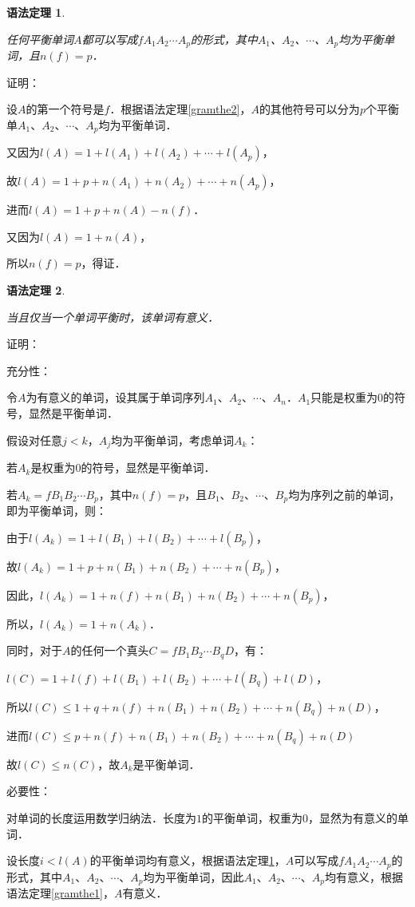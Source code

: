 \documentclass[12pt, a4paper, oneside]{book}
\newtheorem{gramthe}{语法定理}
\begin{document}
			\begin{gramthe}\label{gramthe3}
				\hfill\par
				任何平衡单词$A$都可以写成$fA_1A_2\cdots A_p$的形式，其中$A_1$、$A_2$、$\cdots$、$A_p$均为平衡单词，且$n(f)=p$．	
			\end{gramthe}			
			证明：
			\par
			设$A$的第一个符号是$f$．根据语法定理\ref{gramthe2}，$A$的其他符号可以分为$p$个平衡单$A_1$、$A_2$、$\cdots$、$A_p$均为平衡单词．
			\par
			又因为$l(A)=1+l(A_1)+l(A_2)+\cdots+l(A_p)$，
			\par
			故$l(A)=1+p+n(A_1)+n(A_2)+\cdots+n(A_p)$，
			\par
			进而$l(A)=1+p+n(A)-n(f)$．
			\par
			又因为$l(A)=1+n(A)$，
			\par
			所以$n(f)=p$，得证．
								
			\begin{gramthe}\label{gramthe4}
				\hfill\par
				当且仅当一个单词平衡时，该单词有意义．			
			\end{gramthe}			
			证明：
			\par
			充分性：
			\par
			令$A$为有意义的单词，设其属于单词序列$A_1$、$A_2$、$\cdots$、$A_n$．$A_1$只能是权重为$0$的符号，显然是平衡单词．
			\par
			假设对任意$j<k$，$A_j$均为平衡单词，考虑单词$A_k$：
			\par
			若$A_k$是权重为$0$的符号，显然是平衡单词．
			\par
			若$A_k=fB_1B_2\cdots B_p$，其中$n(f)=p$，且$B_1$、$B_2$、$\cdots$、$B_p$均为序列之前的单词，即为平衡单词，则：
			\par
			由于$l(A_k)=1+l(B_1)+l(B_2)+\cdots+l(B_p)$，
			\par
			故$l(A_k)=1+p+ n(B_1)+n(B_2)+\cdots+n(B_p)$，
			\par
			因此，$l(A_k)=1+n(f)+n(B_1)+n(B_2)+\cdots+n(B_p)$，
			\par
			所以，$l(A_k)=1+n(A_k)$．
			\par
			同时，对于$A$的任何一个真头$C=fB_1B_2\cdots B_qD$，有：
			\par
			$l(C)= 1+l(f)+l(B_1)+l(B_2)+\cdots+l(B_q)+l(D)$，
			\par
			所以$l(C)\leq 1+q+n(f)+n(B_1)+n(B_2)+\cdots+n(B_q)+n(D)$，
			\par
			进而$l(C)\leq p+n(f)+n(B_1)+n(B_2)+\cdots+n(B_q)+n(D)$
			\par
			故$l(C)\leq n(C)$，故$A_k$是平衡单词．
			\par
			必要性：
			\par
			对单词的长度运用数学归纳法．长度为$1$的平衡单词，权重为$0$，显然为有意义的单词．
			\par
			设长度$i<l(A)$的平衡单词均有意义，根据语法定理\ref{gramthe3}，$A$可以写成$f A_1A_2\cdots A_p$的形式，其中$A_1$、$A_2$、$\cdots$、$A_p$均为平衡单词，因此$A_1$、$A_2$、$\cdots$、$A_p$均有意义，根据语法定理\ref{gramthe1}，$A$有意义．			
						
\end{document}
